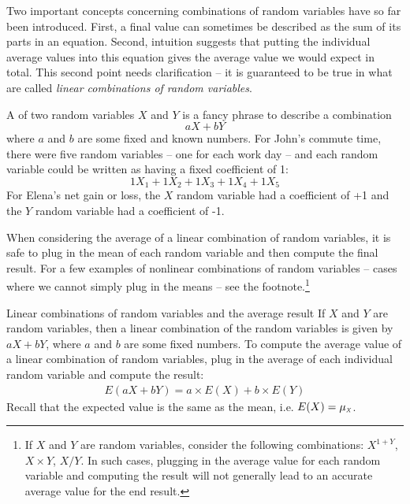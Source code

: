 Two important concepts concerning combinations of random variables have so far been introduced. First, a final value can sometimes be described as the sum of its parts in an equation. Second, intuition suggests that putting the individual average values into this equation gives the average value we would expect in total. This second point needs clarification -- it is guaranteed to be true in what are called \emph{linear combinations of random variables}.

A  of two random variables $X$ and $Y$ is a fancy phrase to describe a combination
$$ aX + bY$$
where $a$ and $b$ are some fixed and known numbers. For John's commute time, there were five random variables -- one for each work day -- and each random variable could be written as having a fixed coefficient of 1:
$$ 1X_1 + 1 X_2 + 1 X_3 + 1 X_4 + 1 X_5 $$
For Elena's net gain or loss, the $X$ random variable had a coefficient of +1 and the $Y$ random variable had a coefficient of -1.

When considering the average of a linear combination of random variables, it is safe to plug in the mean of each random variable and then compute the final result. For a few examples of nonlinear combinations of random variables -- cases where we cannot simply plug in the means -- see the footnote.\footnote{If $X$ and $Y$ are random variables, consider the following combinations: $X^{1+Y}$, $X\times Y$, $X/Y$. In such cases, plugging in the average value for each random variable and computing the result will not generally lead to an accurate average value for the end result.}

\begin{onebox}{Linear combinations of random variables and the average result}
If $X$ and $Y$ are random variables, then a linear combination of the random variables is given by $aX + bY$, where $a$ and $b$ are some fixed numbers. To compute the average value of a linear combination of random variables, plug in the average of each individual random variable and compute the result:
\begin{align*}
E(aX+bY) = a\times E(X) + b\times E(Y)
\end{align*}
Recall that the expected value is the same as the mean, i.e. $E(X) = \mu_{\mbox{\tiny\itshape X}}$.
\end{onebox}

\D{\newpage}

